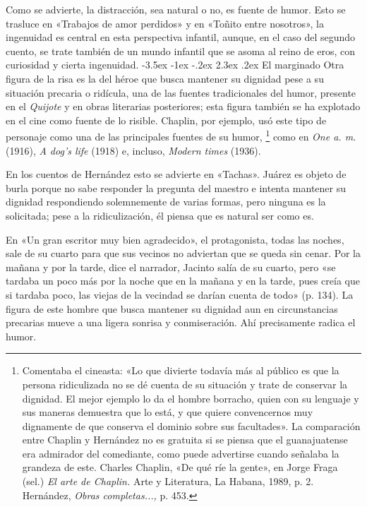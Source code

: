 \documentclass[14pt,twoside,final]{extbook} %
\makeatletter
\let\oldfootnote\footnote
\renewcommand\footnote[1]{%
\oldfootnote{\hspace{1mm}#1}}
\renewcommand\section{\@startsection {section}{1}{\z@}%
                                     {-3.5ex \@plus -1ex \@minus -.2ex}%
                                     {2.3ex \@plus .2ex}%
                                     {\normalfont\large\bfseries\sc}}
\makeatother
\begin{document}
Como se advierte, la distracción, sea natural o no, es fuente de humor. Esto se trasluce en «Trabajos de amor perdidos» y en «Toñito entre nosotros», la ingenuidad es central en esta perspectiva infantil, aunque, en el caso del segundo cuento, se trate también de un mundo infantil que se asoma al reino de eros, con curiosidad y cierta ingenuidad.
\section{El marginado}\label{sec:el-marginado}
Otra figura de la risa es la del héroe que busca mantener su dignidad pese a su situación precaria o ridícula, una de las fuentes tradicionales del humor, presente en el \emph{Quijote} y en obras literarias posteriores; esta figura también se ha explotado en el cine como fuente de lo risible. Chaplin, por ejemplo, usó este tipo de personaje como una de las principales fuentes de su humor,\footnote{Comentaba el cineasta: «Lo que divierte todavía más al público es que la persona ridiculizada no se dé cuenta de su situación y trate de conservar la dignidad. El mejor ejemplo lo da el hombre borracho, quien con su lenguaje y sus maneras demuestra que lo está, y que quiere convencernos muy dignamente de que conserva el dominio sobre sus facultades». La comparación entre Chaplin y Hernández no es gratuita si se piensa que el guanajuatense era admirador del comediante, como puede advertirse cuando señalaba la grandeza de este. Charles Chaplin, «De qué ríe la gente», en Jorge Fraga (sel.) \emph{El arte de Chaplin.} Arte y Literatura, La Habana, 1989, p. 2. Hernández, \emph{Obras completas...,} p. 453.} como en \emph{One a. m.} (1916), \emph{A dog's life} (1918) e, incluso, \emph{Modern times} (1936).

En los cuentos de Hernández esto se advierte en «Tachas». Juárez es objeto de burla porque no sabe responder la pregunta del maestro e intenta mantener su dignidad respondiendo solemnemente de varias formas, pero ninguna es la solicitada; pese a la ridiculización, él piensa que es natural ser como es.

En «Un gran escritor muy bien agradecido», el protagonista, todas las noches, sale de su cuarto para que sus vecinos no adviertan que se queda sin cenar. Por la mañana y por la tarde, dice el narrador, Jacinto salía de su cuarto, pero «se tardaba un poco más por la noche que en la mañana y en la tarde, pues creía que si tardaba poco, las viejas de la vecindad se darían cuenta de todo» (p. 134). La figura de este hombre que busca mantener su dignidad aun en circunstancias precarias mueve a una ligera sonrisa y conmiseración. Ahí precisamente radica el humor.
\end{document}
